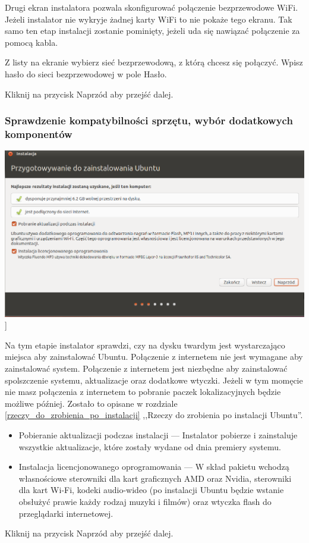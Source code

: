 Drugi ekran instalatora pozwala skonfigurować połączenie bezprzewodowe WiFi. Jeżeli instalator nie wykryje żadnej karty WiFi to nie pokaże tego ekranu. Tak samo ten etap instalacji zostanie pominięty, jeżeli uda się nawiązać połączenie za pomocą kabla.

Z listy na ekranie wybierz sieć bezprzewodową, z którą chcesz się połączyć. Wpisz hasło do sieci bezprzewodowej w pole \textcolor{ubuntu_orange}{Hasło}.
\begin{flushright}
Kliknij na przycisk \textcolor{ubuntu_orange}{Naprzód} aby przejść dalej.
\end{flushright}
\clearpage
\subsubsection{Sprawdzenie kompatybilności sprzętu, wybór dodatkowych komponentów}
\begin{center}
        \includegraphics[width=\linewidth]{images/instalator_wymagania.png}]
\end{center}

Na tym etapie instalator sprawdzi, czy na dysku twardym jest wystarczająco miejsca aby zainstalować Ubuntu. Połączenie z internetem nie jest wymagane aby zainstalować system. Połączenie z internetem jest niezbędne aby zainstalować spolszczenie systemu, aktualizacje oraz dodatkowe wtyczki. Jeżeli w tym momęcie nie masz połączenia z internetem to pobranie paczek lokalizacyjnych będzie możliwe później. Zostało to opisane w rozdziale \ref{rzeczy_do_zrobienia_po_instalacji} ,,Rzeczy do zrobienia po instalacji Ubuntu''.
\begin{itemize}
\item \textcolor{ubuntu_orange}{Pobieranie aktualizacji podczas instalacji} --- Instalator pobierze i zainstaluje wszystkie aktualizacje, które zostały wydane od dnia premiery systemu.
\item \textcolor{ubuntu_orange}{Instalacja licencjonowanego oprogramowania} --- W skład pakietu wchodzą własnościowe sterowniki dla kart graficznych AMD oraz Nvidia, sterowniki dla kart Wi-Fi, kodeki audio-wideo (po instalacji Ubuntu będzie wstanie obsłużyć prawie każdy rodzaj muzyki i filmów) oraz wtyczka flash do przeglądarki internetowej.
\end{itemize}
\begin{flushright}
Kliknij na przycisk \textcolor{ubuntu_orange}{Naprzód} aby przejść dalej.
\end{flushright}
\clearpage
